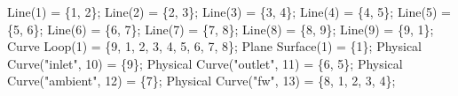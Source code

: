 \documentclass[11pt]{article}
\newenvironment{Shaded}{}{}
\newcommand{\DecValTok}[1]{\textcolor[rgb]{0.25,0.63,0.44}{{#1}}}
\newcommand{\StringTok}[1]{\textcolor[rgb]{0.25,0.44,0.63}{{#1}}}
\newcommand{\NormalTok}[1]{{#1}}
\newcommand{\OperatorTok}[1]{\textcolor[rgb]{0.40,0.40,0.40}{{#1}}}
\begin{document}
\begin{Shaded}
\begin{Highlighting}[]
\NormalTok{Line}\OperatorTok{(}\DecValTok{1}\OperatorTok{)} \OperatorTok{=} \OperatorTok{\{}\DecValTok{1}\OperatorTok{,} \DecValTok{2}\OperatorTok{\};}
\NormalTok{Line}\OperatorTok{(}\DecValTok{2}\OperatorTok{)} \OperatorTok{=} \OperatorTok{\{}\DecValTok{2}\OperatorTok{,} \DecValTok{3}\OperatorTok{\};}
\NormalTok{Line}\OperatorTok{(}\DecValTok{3}\OperatorTok{)} \OperatorTok{=} \OperatorTok{\{}\DecValTok{3}\OperatorTok{,} \DecValTok{4}\OperatorTok{\};}
\NormalTok{Line}\OperatorTok{(}\DecValTok{4}\OperatorTok{)} \OperatorTok{=} \OperatorTok{\{}\DecValTok{4}\OperatorTok{,} \DecValTok{5}\OperatorTok{\};}
\NormalTok{Line}\OperatorTok{(}\DecValTok{5}\OperatorTok{)} \OperatorTok{=} \OperatorTok{\{}\DecValTok{5}\OperatorTok{,} \DecValTok{6}\OperatorTok{\};}
\NormalTok{Line}\OperatorTok{(}\DecValTok{6}\OperatorTok{)} \OperatorTok{=} \OperatorTok{\{}\DecValTok{6}\OperatorTok{,} \DecValTok{7}\OperatorTok{\};}
\NormalTok{Line}\OperatorTok{(}\DecValTok{7}\OperatorTok{)} \OperatorTok{=} \OperatorTok{\{}\DecValTok{7}\OperatorTok{,} \DecValTok{8}\OperatorTok{\};}
\NormalTok{Line}\OperatorTok{(}\DecValTok{8}\OperatorTok{)} \OperatorTok{=} \OperatorTok{\{}\DecValTok{8}\OperatorTok{,} \DecValTok{9}\OperatorTok{\};}
\NormalTok{Line}\OperatorTok{(}\DecValTok{9}\OperatorTok{)} \OperatorTok{=} \OperatorTok{\{}\DecValTok{9}\OperatorTok{,} \DecValTok{1}\OperatorTok{\};}
\NormalTok{Curve Loop}\OperatorTok{(}\DecValTok{1}\OperatorTok{)} \OperatorTok{=} \OperatorTok{\{}\DecValTok{9}\OperatorTok{,} \DecValTok{1}\OperatorTok{,} \DecValTok{2}\OperatorTok{,} \DecValTok{3}\OperatorTok{,} \DecValTok{4}\OperatorTok{,} \DecValTok{5}\OperatorTok{,} \DecValTok{6}\OperatorTok{,} \DecValTok{7}\OperatorTok{,} \DecValTok{8}\OperatorTok{\};}
\NormalTok{Plane Surface}\OperatorTok{(}\DecValTok{1}\OperatorTok{)} \OperatorTok{=} \OperatorTok{\{}\DecValTok{1}\OperatorTok{\};}
\NormalTok{Physical Curve}\OperatorTok{(}\StringTok{"inlet"}\OperatorTok{,} \DecValTok{10}\OperatorTok{)} \OperatorTok{=} \OperatorTok{\{}\DecValTok{9}\OperatorTok{\};}
\NormalTok{Physical Curve}\OperatorTok{(}\StringTok{"outlet"}\OperatorTok{,} \DecValTok{11}\OperatorTok{)} \OperatorTok{=} \OperatorTok{\{}\DecValTok{6}\OperatorTok{,} \DecValTok{5}\OperatorTok{\};}
\NormalTok{Physical Curve}\OperatorTok{(}\StringTok{"ambient"}\OperatorTok{,} \DecValTok{12}\OperatorTok{)} \OperatorTok{=} \OperatorTok{\{}\DecValTok{7}\OperatorTok{\};}
\NormalTok{Physical Curve}\OperatorTok{(}\StringTok{"fw"}\OperatorTok{,} \DecValTok{13}\OperatorTok{)} \OperatorTok{=} \OperatorTok{\{}\DecValTok{8}\OperatorTok{,} \DecValTok{1}\OperatorTok{,} \DecValTok{2}\OperatorTok{,} \DecValTok{3}\OperatorTok{,} \DecValTok{4}\OperatorTok{\};}

\end{Highlighting}
\end{Shaded}
\end{document}
